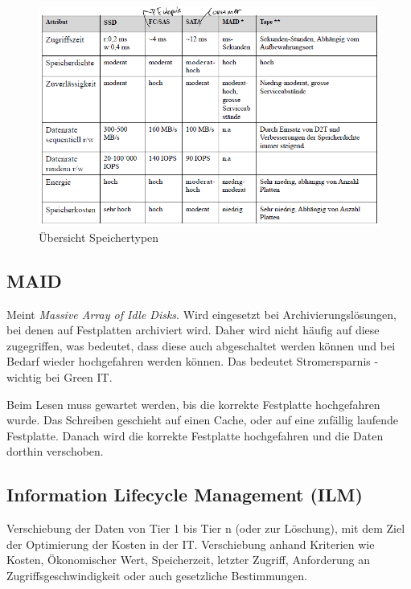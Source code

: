 \begin{figure}[h!]
	\centering
	\includegraphics[width=0.9\linewidth]{fig/speichertypen}
	\caption{Übersicht Speichertypen}
	\label{fig:speichertypen}
\end{figure}

\subsection{MAID}\label{sec:maid}
Meint \emph{Massive Array of Idle Disks}. Wird eingesetzt bei Archivierungslösungen, bei denen auf Festplatten archiviert wird. Daher wird nicht häufig auf diese zugegriffen, was bedeutet, dass diese auch abgeschaltet werden können und bei Bedarf wieder hochgefahren werden können. Das bedeutet Stromersparnis - wichtig bei Green IT.

Beim Lesen muss gewartet werden, bis die korrekte Festplatte hochgefahren wurde. Das Schreiben geschieht auf einen Cache, oder auf eine zufällig laufende Festplatte. Danach wird die korrekte Festplatte hochgefahren und die Daten dorthin verschoben.
\subsection{Information Lifecycle Management (ILM)}
Verschiebung der Daten von Tier 1 bis Tier n (oder zur Löschung), mit dem Ziel der Optimierung der Kosten in der IT. Verschiebung anhand Kriterien wie Kosten, Ökonomischer Wert, Speicherzeit, letzter Zugriff, Anforderung an Zugriffsgeschwindigkeit oder auch gesetzliche Bestimmungen.
